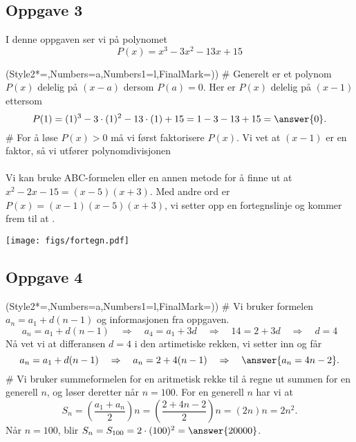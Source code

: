 \subsection*{Oppgave 3}
I denne oppgaven ser vi på polynomet
\begin{equation*}
	P(x) = x^3 - 3x^2 - 13x + 15
\end{equation*}
\begin{easylist}[enumerate]
	\ListProperties(Style2*=,Numbers=a,Numbers1=l,FinalMark={)})
	# Generelt er et polynom $P(x)$ delelig på $(x-a)$ dersom $P(a) = 0$.
	Her er $P(x)$ delelig på $(x-1)$ ettersom 
	\begin{equation*}
	P(1) = (1)^3 - 3\cdot(1)^2 - 13\cdot(1) + 15 = 1 - 3 - 13 + 15 = \answer{0}.
	\end{equation*}
	# For å løse $P(x) > 0$ må vi først faktorisere $P(x)$.
	Vi vet at $(x-1)$ er en faktor, så vi utfører polynomdivisjonen \\
	 \\
	Vi kan bruke ABC-formelen eller en annen metode for å finne ut at $x^2 - 2x -15 = (x - 5)(x + 3)$. 
	Med andre ord er $P(x) = (x - 1)(x - 5)(x + 3)$, vi setter opp en fortegnslinje og kommer frem til at .
\end{easylist}

\begin{center}
	\texttt{[image: figs/fortegn.pdf]}
\end{center}

\subsection*{Oppgave 4}
\begin{easylist}[enumerate]
	\ListProperties(Style2*=,Numbers=a,Numbers1=l,FinalMark={)})
	# Vi bruker formelen $a_n = a_1 + d(n-1)$ og informasjonen fra oppgaven.
	\begin{equation*}
		a_n = a_1 + d(n-1) \quad \Rightarrow \quad 
		a_4 = a_1 + 3d \quad \Rightarrow \quad 
		14 = 2 + 3d \quad \Rightarrow \quad
		d = 4
	\end{equation*}
	Nå vet vi at differansen $d=4$ i den artimetiske rekken, vi setter inn og får
	\begin{equation*}
		a_n = a_1 + d(n-1) \quad \Rightarrow \quad  
		a_n = 2 + 4(n-1) \quad \Rightarrow \quad
		\answer{a_n = 4n - 2}.
	\end{equation*}
	# Vi bruker summeformelen for en aritmetisk rekke til å regne ut summen for en generell $n$, og løser deretter når $n = 100$.
	For en generell $n$ har vi at
	\begin{equation*}
		S_n = \left(\frac{a_1 + a_n}{2}\right) n 
		= \left(\frac{2 + 4n - 2}{2}\right) n
		= \left( 2n\right) n = 2n^2.
	\end{equation*}
	Når $n= 100$, blir $S_n = S_{100} = 2 \cdot (100)^2 = \answer{20000}$.
\end{easylist}

